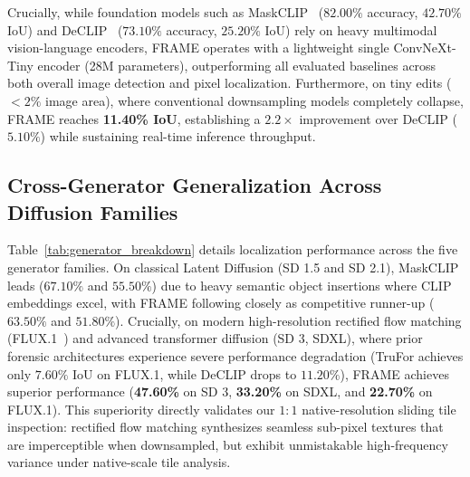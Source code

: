 \documentclass[sigconf,review=true]{acmart}
\begin{document}
Crucially, while foundation models such as MaskCLIP~\cite{opensdi} ($82.00\%$ accuracy, $42.70\%$ IoU) and DeCLIP~\cite{declip} ($73.10\%$ accuracy, $25.20\%$ IoU) rely on heavy multimodal vision-language encoders, FRAME operates with a lightweight single ConvNeXt-Tiny encoder (28M parameters), outperforming all evaluated baselines across both overall image detection and pixel localization. Furthermore, on tiny edits ($<2\%$ image area), where conventional downsampling models completely collapse, FRAME reaches \textbf{11.40\% IoU}, establishing a $2.2\times$ improvement over DeCLIP ($5.10\%$) while sustaining real-time inference throughput.

\subsection{Cross-Generator Generalization Across Diffusion Families}
Table~\ref{tab:generator_breakdown} details localization performance across the five generator families. On classical Latent Diffusion (SD 1.5 and SD 2.1), MaskCLIP leads ($67.10\%$ and $55.50\%$) due to heavy semantic object insertions where CLIP embeddings excel, with FRAME following closely as competitive runner-up ($63.50\%$ and $51.80\%$). Crucially, on modern high-resolution rectified flow matching (FLUX.1~\cite{flux}) and advanced transformer diffusion (SD 3, SDXL), where prior forensic architectures experience severe performance degradation (TruFor achieves only $7.60\%$ IoU on FLUX.1, while DeCLIP drops to $11.20\%$), FRAME achieves superior performance (\textbf{47.60\%} on SD 3, \textbf{33.20\%} on SDXL, and \textbf{22.70\%} on FLUX.1). This superiority directly validates our $1:1$ native-resolution sliding tile inspection: rectified flow matching synthesizes seamless sub-pixel textures that are imperceptible when downsampled, but exhibit unmistakable high-frequency variance under native-scale tile analysis.
\end{document}
